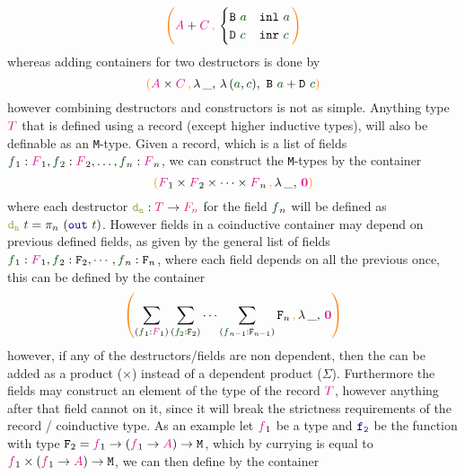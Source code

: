 \documentclass[twoside,11pt,openright]{report}
\theoremstyle{plain} %
\theoremstyle{definition}
\theoremstyle{remark}
\newcommand*{\term}[1]{\textcolor{green!30!black}{#1}} %
\newcommand*{\type}[1]{\textcolor{magenta!90!black}{#1}}
\newcommand*{\containerpair}[2]{\ensuremath{\colorlet{savedleftcolor}{.}\color{orange}\left(\color{savedleftcolor}#1\,\textcolor{orange}{\mathbf{,}}\,#2\color{orange}\right)\color{savedleftcolor}}}
\newcommand*{\containerpairsimple}[2]{\containerpair{#1}{\lambda\,\_,\,#2}}
\newcommand*{\empt}{\type{\textbf{0}}}
\newcommand*{\function}[1]{\textcolor{blue!60!black}{\ensuremath{\mathtt{#1}}}}
\newcommand*{\destructor}[1]{\textcolor{yellow!60!black}{\ensuremath{\mathtt{#1}}}}
\newcommand*{\typeformer}[1]{\ensuremath{\mathtt{#1}}}
\begin{document}
\begin{equation}
  \containerpair{\type{A} + \type{C}}{ \begin{cases} \typeformer{B}~\term{a} & \mathtt{inl}~\term{a} \\ \typeformer{D}~\term{c} & \mathtt{inr}~\term{c} \end{cases}}
\end{equation}
whereas adding containers for two destructors is done by 
\begin{equation}
  \containerpairsimple{\type{A} \times \type{C}}{\lambda\,(\term{a},\term{c}),~\typeformer{B}~\term{a} + \typeformer{D}~\term{c}}  
\end{equation}
however combining destructors and constructors is not as simple. Anything type \(\type{T}\) that is defined using a record (except higher inductive types), will also be definable as an \texttt{M}-type. Given a record, which is a list of fields \(\term{f}_1 : \type{F}_1,\term{f}_2 : \type{F}_2,\dots,\term{f}_n : \type{F}_n\), we can construct the \texttt{M}-types by the container
\begin{equation}
  \containerpairsimple{\type{F}_1 \times \type{F}_2 \times \dots \times \type{F}_n}{\empt}
\end{equation}
where each destructor \(\destructor{d_n} : \type{T} \rightarrow \type{F_n}\) for the field \(\term{f}_n\) will be defined as \(\destructor{d_n}~\term{t} = \pi_n~(\function{out}~\term{t})\). However fields in a coinductive container may depend on previous defined fields, as given by the general list of fields \(\term{f}_1 : \type{F}_1,\term{f}_2 : \typeformer{F}_2,\cdots,\term{f}_n : \typeformer{F}_n\), where each field depends on all the previous once, this can be defined by the container
\begin{equation}
  \containerpairsimple{\sum_{(\term{f}_1 : \type{F}_1)} \sum_{(\term{f_2} : \typeformer{F}_2)} \cdots \sum_{(\term{f}_{n-1} : \typeformer{F}_{n-1})}\typeformer{F}_n}{\empt}
\end{equation}
however, if any of the destructors/fields are non dependent, then the can be added as a product (\(\times\)) instead of a dependent product (\(\Sigma\)). Furthermore the fields may construct an element of the type of the record \(\type{T}\), however anything after that field cannot on it, since it will break the strictness requirements of the record / coinductive type. As an example let \(\type{f}_1\) be a type and \(\function{f_2}\) be the function with type \(\typeformer{F}_2 = \type{f}_1 \rightarrow (\type{f}_1 \rightarrow \type{A}) \rightarrow \mathtt{M}\), which by currying is equal to \(\type{f}_1 \times (\type{f}_1 \rightarrow \type{A}) \rightarrow \mathtt{M}\), we can then define by the container
\end{document}
